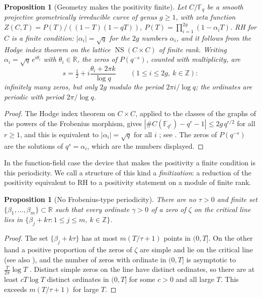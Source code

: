 \documentclass[11pt]{amsart}
\newtheorem{proposition}[theorem]{Proposition}
\theoremstyle{definition}
\theoremstyle{remark}
\DeclareMathOperator{\NS}{NS}
\newcommand{\bbZ}{\mathbb{Z}}
\newcommand{\bbF}{\mathbb{F}}
\newcommand{\bbR}{\mathbb{R}}
\begin{document}
\begin{proposition}[Geometry makes the positivity finite]\label{prop:finit}
Let $C/\bbF_q$ be a smooth projective geometrically irreducible curve of genus
$g\ge1$, with zeta function $Z(C,T)=P(T)/((1-T)(1-qT))$,
$P(T)=\prod_{i=1}^{2g}(1-\alpha_iT)$. RH for $C$ is a \emph{finite} condition:
$|\alpha_i|=\sqrt q$ for the $2g$ numbers $\alpha_i$, and it follows from the
Hodge index theorem on the lattice $\NS(C\times C)$ of finite rank. Writing
$\alpha_i=\sqrt q\,e^{i\theta_i}$ with $\theta_i\in\bbR$, the zeros of
$P(q^{-s})$, counted with multiplicity, are
\[
s=\tfrac12+i\frac{\theta_i+2\pi k}{\log q}\qquad(1\le i\le 2g,\ k\in\bbZ):
\]
infinitely many zeros, but only $2g$ modulo the period $2\pi i/\log q$; the
ordinates are periodic with period $2\pi/\log q$.
\end{proposition}
\begin{proof}
The Hodge index theorem on $C\times C$, applied to the classes of the graphs
of the powers of the Frobenius morphism, gives
$|\#C(\bbF_{q^r})-q^r-1|\le 2g\,q^{r/2}$ for all $r\ge1$, and this is
equivalent to $|\alpha_i|=\sqrt q$ for all $i$ \cite{Weil48}; see
\cite[V, Ex.~1.10 and App.~C, Ex.~5.7]{Hartshorne}. The zeros of $P(q^{-s})$
are the solutions of $q^{s}=\alpha_i$, which are the numbers displayed.
\end{proof}

In the function-field case the device that makes the positivity a finite
condition is this periodicity. We call a structure of this kind a
\emph{finitization}: a reduction of the positivity equivalent to RH to a
positivity statement on a module of finite rank.

\begin{proposition}[No Frobenius-type periodicity]\label{thm:LI}
There are no $\tau>0$ and finite set $\{\beta_1,\dots,\beta_m\}\subset\bbR$
such that every ordinate $\gamma>0$ of a zero of $\zeta$ on the critical line
lies in $\{\beta_j+k\tau:1\le j\le m,\ k\in\bbZ\}$.
\end{proposition}
\begin{proof}
The set $\{\beta_j+k\tau\}$ has at most $m(T/\tau+1)$ points in $(0,T]$. On
the other hand a positive proportion of the zeros of $\zeta$ are simple and
lie on the critical line \cite{HeathBrown79} (see also
\cite{Selberg42,Levinson74,Conrey89}), and the number of zeros with ordinate
in $(0,T]$ is asymptotic to $\frac{T}{2\pi}\log T$
\cite[Thm.~9.4]{bgTitchmarsh}. Distinct simple zeros on the line have distinct
ordinates, so there are at least $cT\log T$ distinct ordinates in $(0,T]$ for
some $c>0$ and all large $T$. This exceeds $m(T/\tau+1)$ for large $T$.
\end{proof}
\end{document}
